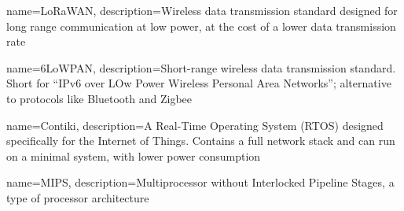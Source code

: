 \makeglossaries

{
  name=LoRaWAN,
  description={Wireless data transmission standard designed for long range communication at low power, at the cost of a lower data transmission rate}
}

{
  name=6LoWPAN,
  description={Short-range wireless data transmission standard. Short for ``IPv6 over LOw Power Wireless Personal Area Networks''; alternative to protocols like Bluetooth and Zigbee}
}

{
  name={Contiki},
  description={A Real-Time Operating System (RTOS) designed specifically for the Internet of Things. Contains a full network stack and can run on a minimal system, with lower power consumption}
}

{
  name={MIPS},
  description={Multiprocessor without Interlocked Pipeline Stages, a type of
  processor architecture}
}